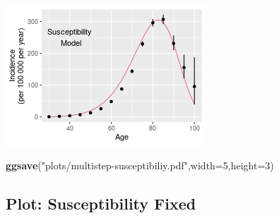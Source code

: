 \documentclass[
]{article}
\newenvironment{Shaded}{\begin{snugshade}}{\end{snugshade}}
\newcommand{\DataTypeTok}[1]{\textcolor[rgb]{0.13,0.29,0.53}{#1}}
\newcommand{\DecValTok}[1]{\textcolor[rgb]{0.00,0.00,0.81}{#1}}
\newcommand{\KeywordTok}[1]{\textcolor[rgb]{0.13,0.29,0.53}{\textbf{#1}}}
\newcommand{\NormalTok}[1]{#1}
\newcommand{\StringTok}[1]{\textcolor[rgb]{0.31,0.60,0.02}{#1}}
\begin{document}
\includegraphics{multistep-model-comparison_files/figure-latex/susceptibility-1.png}

\begin{Shaded}
\begin{Highlighting}[]
\KeywordTok{ggsave}\NormalTok{(}\StringTok{"plots/multistep-susceptibiliy.pdf"}\NormalTok{,}\DataTypeTok{width=}\DecValTok{5}\NormalTok{,}\DataTypeTok{height=}\DecValTok{3}\NormalTok{)}
\end{Highlighting}
\end{Shaded}

\hypertarget{plot-susceptibility-fixed}{%
\subsection{Plot: Susceptibility
Fixed}\label{plot-susceptibility-fixed}}
\end{document}
